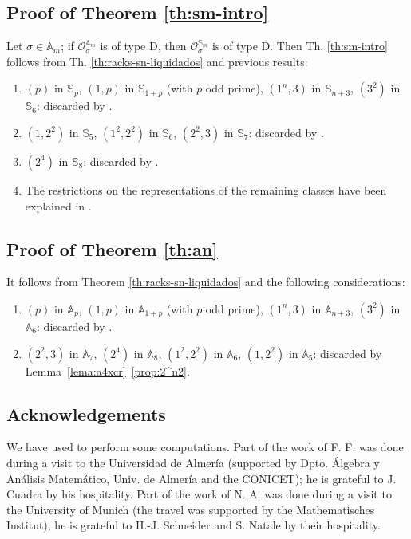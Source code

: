 \documentclass[11pt]{amsart} \textheight 22cm
\renewcommand{\^}[1]{\mbox{$^{\left( #1 \right)}$}}
\renewcommand{\_}[1]{\mbox{$_{\left( #1 \right)}$}}
\newcommand{\oc}{{\mathcal O}}
\theoremstyle{plain}
\theoremstyle{definition}
\theoremstyle{remark}
\newcommand\sco{\mathbb S_5}
\newcommand\A{\mathbb A}
\newcommand\sm{\mathbb S_m}
\newcommand\soc{\mathbb S_8}
\newcommand\sei{\mathbb S_6}
\newcommand\sst{\mathbb S_7}
\newcommand\s{\mathbb S}
\theoremstyle{remark}
\begin{document}
\subsection{Proof of Theorem \ref{th:sm-intro}}

Let $\sigma\in \A_m$; if $\oc_{\sigma}^{ \A_m}$ is of type D,
    then $\oc_{\sigma}^{ \sm}$ is of type D. Then Th. \ref{th:sm-intro}
follows from Th. \ref{th:racks-sn-liquidados} and previous results:
\begin{enumerate}

    \item $(p)$ in $\s_{p}$, $(1,p)$ in $\s_{1+p}$  (with $p$ odd prime),
    $(1^n,3)$ in $\s_{n+3}$, $(3^2)$ in $\s_6$: discarded by \cite[Th. 1]{AZ}.

    \medbreak
    \item $(1,2^2)$ in $\sco$, $(1^2,2^2)$ in $\sei$, $(2^2,3)$ in $\sst$: discarded by  \cite[Th. 1]{AZ}.

    \medbreak
    \item $(2^4)$ in $\soc$: discarded by \cite[Th.~1~(B)~(i)]{AF1}.


    \medbreak
    \item The restrictions on the representations of the remaining classes have been
        explained in \cite{afz}.
\end{enumerate}



\medbreak\subsection{Proof of Theorem \ref{th:an}}


It follows from Theorem \ref{th:racks-sn-liquidados} and the
following considerations:
\begin{enumerate}
    \item $(p)$ in $\A_{p}$, $(1,p)$ in $\A_{1+p}$  (with $p$ odd prime),
    $(1^n,3)$ in $\A_{n+3}$, $(3^2)$ in $\A_6$:
    discarded by \cite[Th. 2.3]{AF2}.

    \medbreak
    \item $(2^2,3)$ in $\A_7$, $(2^4)$ in $\A_8$, $(1^2,2^2)$ in $\A_6$, $(1,2^2)$ in
        $\A_5$: discarded by  Lemma~\ref{lema:a4xcr}~\eqref{prop:2^n2}.
\end{enumerate}


\medbreak\subsection*{Acknowledgements} We have used \cite{GAP} to perform some
computations.  Part of the work of F. F. was done during a visit to the Universidad de
Almer\'ia (supported by Dpto. \'Algebra y An\'alisis Matem\'atico, Univ. de Almer\'ia and the
CONICET); he is grateful to J. Cuadra by his hospitality.  Part of the work of N. A. was
done during a visit to the University of Munich (the travel was supported by the Mathematisches
Institut); he is grateful to H.-J. Schneider and S. Natale by their hospitality.
\end{document}
